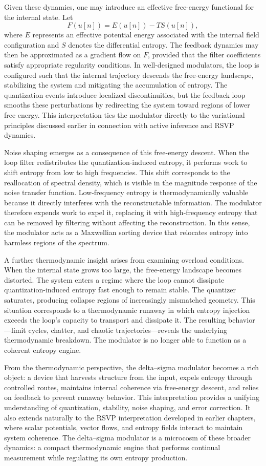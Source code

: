 Given these dynamics, one may introduce an effective free-energy functional for the internal state. Let
\[
F(u[n]) = E(u[n]) - T S(u[n]),
\]
where \(E\) represents an effective potential energy associated with the internal field configuration and \(S\) denotes the differential entropy. The feedback dynamics may then be approximated as a gradient flow on \(F\), provided that the filter coefficients satisfy appropriate regularity conditions. In well-designed modulators, the loop is configured such that the internal trajectory descends the free-energy landscape, stabilizing the system and mitigating the accumulation of entropy. The quantization events introduce localized discontinuities, but the feedback loop smooths these perturbations by redirecting the system toward regions of lower free energy. This interpretation ties the modulator directly to the variational principles discussed earlier in connection with active inference and RSVP dynamics.

Noise shaping emerges as a consequence of this free-energy descent. When the loop filter redistributes the quantization-induced entropy, it performs work to shift entropy from low to high frequencies. This shift corresponds to the reallocation of spectral density, which is visible in the magnitude response of the noise transfer function. Low-frequency entropy is thermodynamically valuable because it directly interferes with the reconstructable information. The modulator therefore expends work to expel it, replacing it with high-frequency entropy that can be removed by filtering without affecting the reconstruction. In this sense, the modulator acts as a Maxwellian sorting device that relocates entropy into harmless regions of the spectrum.

A further thermodynamic insight arises from examining overload conditions. When the internal state grows too large, the free-energy landscape becomes distorted. The system enters a regime where the loop cannot dissipate quantization-induced entropy fast enough to remain stable. The quantizer saturates, producing collapse regions of increasingly mismatched geometry. This situation corresponds to a thermodynamic runaway in which entropy injection exceeds the loop's capacity to transport and dissipate it. The resulting behavior—limit cycles, chatter, and chaotic trajectories—reveals the underlying thermodynamic breakdown. The modulator is no longer able to function as a coherent entropy engine.

From the thermodynamic perspective, the delta–sigma modulator becomes a rich object: a device that harvests structure from the input, expels entropy through controlled routes, maintains internal coherence via free-energy descent, and relies on feedback to prevent runaway behavior. This interpretation provides a unifying understanding of quantization, stability, noise shaping, and error correction. It also extends naturally to the RSVP interpretation developed in earlier chapters, where scalar potentials, vector flows, and entropy fields interact to maintain system coherence. The delta–sigma modulator is a microcosm of these broader dynamics: a compact thermodynamic engine that performs continual measurement while regulating its own entropy production.

